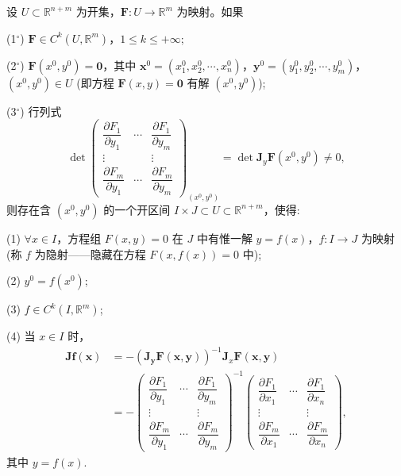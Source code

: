 \begin{theorem}[隐射存在定理]\label{thm:8.4.2}
设 $U \subset \mathbb{R}^{n+m}$ 为开集，$\boldsymbol{F}: U \to \mathbb{R}^{m}$ 为映射。如果

(1$^\circ$) $\boldsymbol{F} \in C^{k}(U,\mathbb{R}^{m})$，$1 \leqslant k \leqslant +\infty$;

(2$^\circ$) $\boldsymbol{F}(x^{0},y^{0}) = \boldsymbol{0}$，其中 $\boldsymbol{x}^{0} = (x_{1}^{0},x_{2}^{0},\cdots,x_{n}^{0})$，$\boldsymbol{y}^{0} = (y_{1}^{0},y_{2}^{0},\cdots,y_{m}^{0})$，$(x^{0},y^{0}) \in U$ (即方程 $\boldsymbol{F}(x,y) = \boldsymbol{0}$ 有解 $(x^{0},y^{0})$);

(3$^\circ$) 行列式
\[
  \det\begin{pmatrix}
    \dfrac{\partial F_{1}}{\partial y_{1}} & \cdots & \dfrac{\partial F_{1}}{\partial y_{m}} \\
    \vdots & & \vdots \\
    \dfrac{\partial F_{m}}{\partial y_{1}} & \cdots & \dfrac{\partial F_{m}}{\partial y_{m}}
  \end{pmatrix}_{(x^{0},y^{0})} = \det \boldsymbol{J}_{y}\boldsymbol{F}(x^{0},y^{0}) \neq 0,
\]
则存在含 $(x^{0},y^{0})$ 的一个开区间 $I \times J \subset U \subset \mathbb{R}^{n+m}$，使得:

(1) $\forall x \in I$，方程组 $F(x,y) = 0$ 在 $J$ 中有惟一解 $y = f(x)$，$f: I \to J$ 为映射 (称 $f$ 为隐射——隐藏在方程 $F(x,f(x)) = 0$ 中);

(2) $y^{0} = f(x^{0})$;

(3) $f \in C^{k}(I,\mathbb{R}^{m})$;

(4) 当 $x \in I$ 时，
\begin{align*}
  \boldsymbol{J}\boldsymbol{f}(\boldsymbol{x}) &= -\left(\boldsymbol{J}_{\boldsymbol{y}}\boldsymbol{F}(\boldsymbol{x},\boldsymbol{y})\right)^{-1} \boldsymbol{J}_{x}\boldsymbol{F}(\boldsymbol{x},\boldsymbol{y}) \\
  &= -\begin{pmatrix}
    \dfrac{\partial F_{1}}{\partial y_{1}} & \cdots & \dfrac{\partial F_{1}}{\partial y_{m}} \\
    \vdots & & \vdots \\
    \dfrac{\partial F_{m}}{\partial y_{1}} & \cdots & \dfrac{\partial F_{m}}{\partial y_{m}}
  \end{pmatrix}^{-1}
  \begin{pmatrix}
    \dfrac{\partial F_{1}}{\partial x_{1}} & \cdots & \dfrac{\partial F_{1}}{\partial x_{n}} \\
    \vdots & & \vdots \\
    \dfrac{\partial F_{m}}{\partial x_{1}} & \cdots & \dfrac{\partial F_{m}}{\partial x_{n}}
  \end{pmatrix},
\end{align*}
其中 $y = f(x)$.
\end{theorem}

